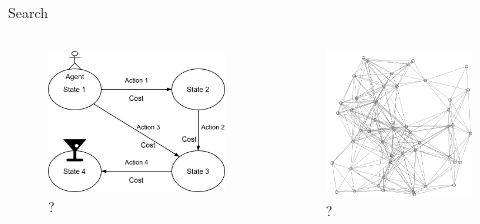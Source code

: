 \begin{frame}{Search}
	\begin{columns}
		\begin{column}{.5\textwidth}
			\begin{figure}
				\includegraphics[width=.9\textwidth, center]{figures/ai_search_simple}
				\caption*{?}
			\end{figure}
		\end{column}
		\begin{column}{.5\textwidth}
			\begin{figure}
				\includegraphics[width=.75\textwidth, center]{figures/DijkstraDemo-0}
				\caption*{?}
			\end{figure}
		\end{column}
	\end{columns}
\end{frame}

